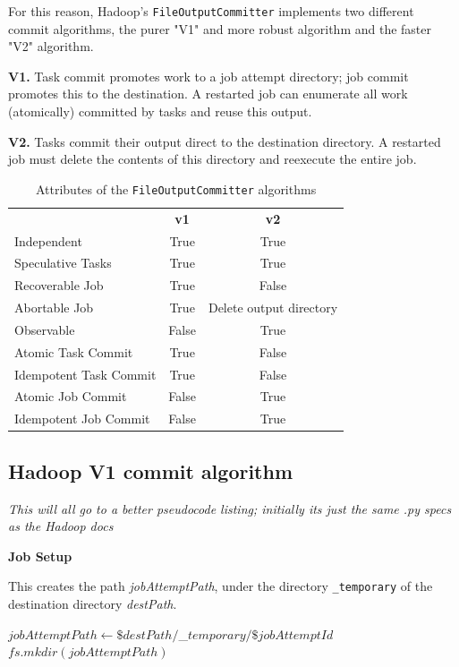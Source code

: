 \documentclass[conference]{IEEEtran}
\begin{document}
For this reason, Hadoop's \texttt{FileOutputCommitter} implements two
different commit algorithms, the purer "V1" and more robust algorithm and the
faster "V2" algorithm.


\textbf{V1.}
Task commit promotes work to a job attempt directory;
job commit promotes this to the destination.
A restarted job can enumerate all work (atomically)
committed by tasks and reuse this output.

\textbf{V2.}
Tasks commit their output direct to the destination directory.
A restarted job must delete the contents of this directory and reexecute
the entire job.

\begin{table}
  \caption{Attributes of the \texttt{FileOutputCommitter} algorithms}
  \begin{tabular}{ l c c }
    \hline
    & \textbf{v1} & \textbf{v2} \\
    Independent & True & True \\
    Speculative Tasks & True & True \\
    Recoverable Job & True & False \\
    Abortable Job & True & Delete output directory \\
    Observable & False & True \\
    Atomic Task Commit & True & False \\
    Idempotent Task Commit & True & False \\
    Atomic Job Commit & False & True \\
    Idempotent Job Commit & False & True \\
    \hline
  \end{tabular}
  \label{tab:file-committer-attributes}
\end{table}


\subsection{Hadoop V1 commit algorithm}
\label{subsec:hadoopV1CommitAlgorithm}


\emph{This will all go to a better pseudocode listing;
initially its just the same .py specs as the Hadoop docs}

\textbf{Job Setup}

This creates the path \emph{jobAttemptPath}, under the
directory \texttt{\_temporary} of the destination directory
\emph{destPath}.

\begin{algorithmic}
  \STATE $jobAttemptPath \leftarrow \$destPath/$\_$temporary/\$jobAttemptId$
  $fs.mkdir(jobAttemptPath)$
\end{algorithmic}
\end{document}
